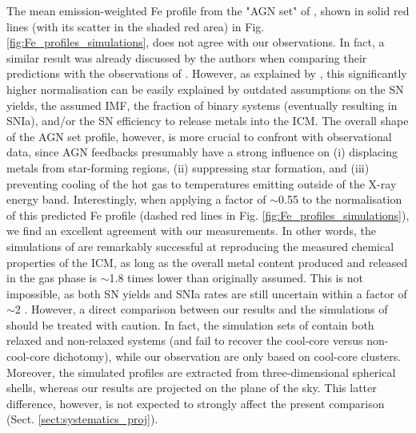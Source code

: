 \documentclass{aa}
\begin{document}
The mean emission-weighted Fe profile from the "AGN set" of \citet[][derived from a sample of 36 hot nearby systems within 29 simulated regions]{2014MNRAS.438..195P}, shown in solid red lines (with its scatter in the shaded red area) in Fig. \ref{fig:Fe_profiles_simulations}, does not agree with our observations. In fact, a similar result was already discussed by the authors when comparing their predictions with the observations of \citet{2008A&A...487..461L}. However, as explained by \citet[][]{2014MNRAS.438..195P}, this significantly higher normalisation can be easily explained by outdated assumptions on the SN yields, the assumed IMF, the fraction of binary systems (eventually resulting in SNIa), and/or the SN efficiency to release metals into the ICM. The overall shape of the AGN set profile, however, is more crucial to confront with observational data, since AGN feedbacks presumably have a strong influence on (i) displacing metals from star-forming regions, (ii) suppressing star formation, and (iii) preventing cooling of the hot gas to temperatures emitting outside of the X-ray energy band. Interestingly, when applying a factor of $\sim$0.55 to the normalisation of this predicted Fe profile (dashed red lines in Fig. \ref{fig:Fe_profiles_simulations}), we find an excellent agreement with our measurements. In other words, the simulations of \citet[][]{2014MNRAS.438..195P} are remarkably successful at reproducing the measured chemical properties of the ICM, as long as the overall metal content produced and released in the gas phase is $\sim$1.8 times lower than originally assumed. This is not impossible, as both SN yields and SNIa rates are still uncertain within a factor of $\sim$2 \citep{2009MNRAS.399..574W}. However, a direct comparison between our results and the simulations of \citet[][]{2014MNRAS.438..195P} should be treated with caution. In fact, the simulation sets of \citet[][]{2014MNRAS.438..195P} contain both relaxed and non-relaxed systems (and fail to recover the cool-core versus non-cool-core dichotomy), while our observation are only based on cool-core clusters. Moreover, the simulated profiles are extracted from three-dimensional spherical shells, whereas our results are projected on the plane of the sky. This latter difference, however, is not expected to strongly affect the present comparison (Sect. \ref{sect:systematics_proj}).
\end{document}
